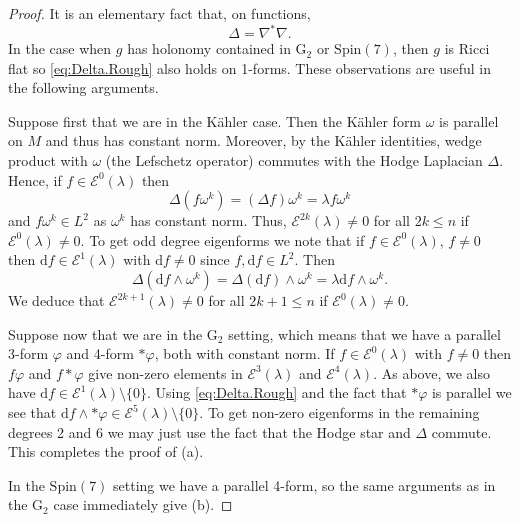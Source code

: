 \documentclass{article}
\theoremstyle{definition}
\numberwithin{thm}{section}
\numberwithin{equation}{section}
\def\d{\mathrm{d}}
\begin{document}
\begin{proof}
It is an elementary fact that, on functions,
\begin{equation}\label{eq:Delta.Rough}
    \Delta=\nabla^*\nabla.
\end{equation}
In the case when $g$ has holonomy contained in $\mathrm{G}_2$ or $\mathrm{Spin}(7)$, then $g$ is Ricci flat so \eqref{eq:Delta.Rough} also holds on 1-forms.  These observations are useful in the following arguments.

Suppose first that we are in the K\"ahler case.  Then the K\"ahler form $\omega$ is parallel on $M$ and thus has constant norm. Moreover, by the K\"ahler identities, wedge product with $\omega$ (the Lefschetz operator) commutes with the Hodge Laplacian $\Delta$.  Hence, if $f\in\mathcal{E}^0(\lambda)$ then
\begin{equation}
    \Delta(f\omega^k)=(\Delta f)\omega^k=\lambda f\omega^k
\end{equation}
 and $f\omega^k\in L^2$ as $\omega^k$ has constant norm.
Thus, $\mathcal{E}^{2k}(\lambda)\neq 0$ for all $2k\leq n$ if $\mathcal{E}^0(\lambda)\neq 0$.  To get odd degree eigenforms we note that if $f\in\mathcal{E}^0(\lambda)$, $f\neq 0$ then $\d f\in\mathcal{E}^1(\lambda)$ with $\d f\neq 0$ since $f,\d f\in L^2$. Then
\begin{equation}
    \Delta(\d f\wedge\omega^k)=\Delta(\d f)\wedge\omega^k=\lambda\d f\wedge\omega^k.
\end{equation}
We deduce that $\mathcal{E}^{2k+1}(\lambda)\neq 0$ for all $2k+1\leq n$ if $\mathcal{E}^0(\lambda)\neq 0$.

Suppose now that we are in the $\mathrm{G}_2$ setting, which means that we have a parallel 3-form $\varphi$ and 4-form $*\varphi$, both with constant norm.  If $f\in\mathcal{E}^0(\lambda)$ with $f\neq 0$ then $f\varphi$ and $f*\varphi$ give non-zero elements in $\mathcal{E}^3(\lambda)$ and $\mathcal{E}^4(\lambda)$. As above, we also have $\d f\in\mathcal{E}^1(\lambda)\setminus\{0\}$.  Using \eqref{eq:Delta.Rough} and the fact that $*\varphi$ is parallel we see that $\d f\wedge *\varphi\in\mathcal{E}^5(\lambda)\setminus\{0\}$.  To get non-zero eigenforms in the remaining degrees 2 and 6 we may just use the fact that the Hodge star and $\Delta$ commute.  This completes the proof of (a).

In the $\mathrm{Spin}(7)$ setting we have a parallel 4-form, so the same arguments as in the $\mathrm{G}_2$ case  immediately give (b).  
\end{proof}
\end{document}
